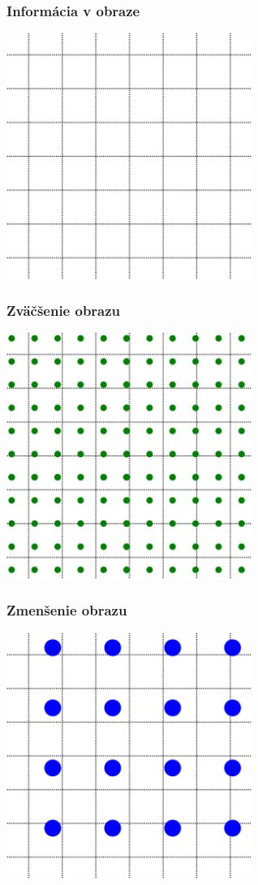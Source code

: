 \documentclass{beamer}
\begin{document}
\begin{frame}
\frametitle{Informácia v obraze}
\centering
\includegraphics[width=0.6\textwidth]{resize3.png}
\end{frame}


\begin{frame}
\frametitle{Zväčšenie obrazu}
\centering
\includegraphics[width=0.6\textwidth]{resize4.png}
\end{frame}


\begin{frame}
\centering
\frametitle{Zmenšenie obrazu}
\includegraphics[width=0.6\textwidth]{resize5.png}
\end{frame}
\end{document}
